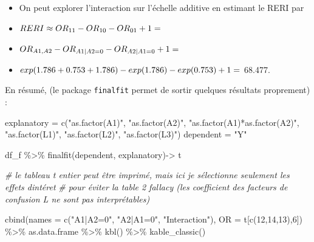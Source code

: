 \documentclass[
]{book}
\newenvironment{Shaded}{\begin{snugshade}}{\end{snugshade}}
\newcommand{\AttributeTok}[1]{\textcolor[rgb]{0.77,0.63,0.00}{#1}}
\newcommand{\CommentTok}[1]{\textcolor[rgb]{0.56,0.35,0.01}{\textit{#1}}}
\newcommand{\DecValTok}[1]{\textcolor[rgb]{0.00,0.00,0.81}{#1}}
\newcommand{\FunctionTok}[1]{\textcolor[rgb]{0.00,0.00,0.00}{#1}}
\newcommand{\NormalTok}[1]{#1}
\newcommand{\OtherTok}[1]{\textcolor[rgb]{0.56,0.35,0.01}{#1}}
\newcommand{\SpecialCharTok}[1]{\textcolor[rgb]{0.00,0.00,0.00}{#1}}
\newcommand{\StringTok}[1]{\textcolor[rgb]{0.31,0.60,0.02}{#1}}
\providecommand{\tightlist}{%
  \setlength{\itemsep}{0pt}\setlength{\parskip}{0pt}}
\begin{document}
\begin{itemize}
  \begin{itemize}
  \tightlist
  \item
    On peut explorer l'interaction sur l'échelle additive en estimant le RERI par
  \item
    \(\small RERI \approx OR_{11} - OR_{10} - OR_{01} + 1 =\)
  \item
    \(\small OR_{A1,A2} - OR_{A1|A2=0} - OR_{A2|A1=0} + 1 =\)
  \item
    \(\small exp(1.786+0.753+1.786) - exp(1.786) - exp(0.753) + 1 =\) 68.477.
  \end{itemize}
\end{itemize}

En résumé, (le package \texttt{finalfit} permet de sortir quelques résultats proprement) :

\begin{Shaded}
\begin{Highlighting}[]
\NormalTok{explanatory }\OtherTok{=} \FunctionTok{c}\NormalTok{(}\StringTok{"as.factor(A1)"}\NormalTok{,}
                \StringTok{"as.factor(A2)"}\NormalTok{,}
                \StringTok{"as.factor(A1)*as.factor(A2)"}\NormalTok{, }
                \StringTok{"as.factor(L1)"}\NormalTok{,}
                \StringTok{"as.factor(L2)"}\NormalTok{, }
                \StringTok{"as.factor(L3)"}\NormalTok{)}
\NormalTok{dependent }\OtherTok{=} \StringTok{"Y"}

\NormalTok{df\_f }\SpecialCharTok{\%\textgreater{}\%}
  \FunctionTok{finalfit}\NormalTok{(dependent, explanatory)}\OtherTok{{-}\textgreater{}}\NormalTok{ t}

\CommentTok{\# le tableau t entier peut être imprimé, mais ici je sélectionne seulement les effets d\textquotesingle{}intéret }
\CommentTok{\# pour éviter la table 2 fallacy (les coefficient des facteurs de confusion L ne sont pas interprétables)}

\FunctionTok{cbind}\NormalTok{(}\AttributeTok{names =} \FunctionTok{c}\NormalTok{(}\StringTok{"A1|A2=0"}\NormalTok{, }\StringTok{"A2|A1=0"}\NormalTok{, }\StringTok{"Interaction"}\NormalTok{), }
      \AttributeTok{OR =}\NormalTok{ t[}\FunctionTok{c}\NormalTok{(}\DecValTok{12}\NormalTok{,}\DecValTok{14}\NormalTok{,}\DecValTok{13}\NormalTok{),}\DecValTok{6}\NormalTok{]) }\SpecialCharTok{\%\textgreater{}\%}
\NormalTok{  as.data.frame }\SpecialCharTok{\%\textgreater{}\%} 
      \FunctionTok{kbl}\NormalTok{() }\SpecialCharTok{\%\textgreater{}\%}
      \FunctionTok{kable\_classic}\NormalTok{() }
\end{Highlighting}
\end{Shaded}
\end{document}
